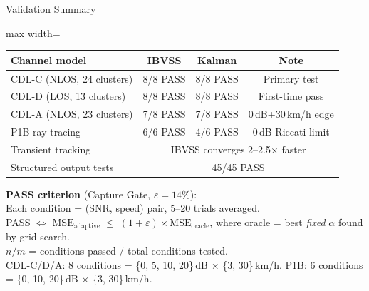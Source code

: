 \documentclass[aspectratio=169, 11pt]{beamer}
\begin{document}
\begin{frame}{Validation Summary}
\centering
\footnotesize
\begin{adjustbox}{max width=\linewidth}
\begin{tabular}{lccc}
\toprule
\textbf{Channel model} & \textbf{IBVSS} & \textbf{Kalman} & \textbf{Note} \\
\midrule
CDL-C (NLOS, 24 clusters) & 8/8 PASS & 8/8 PASS & Primary test \\
CDL-D (LOS, 13 clusters)  & 8/8 PASS & 8/8 PASS & First-time pass \\
CDL-A (NLOS, 23 clusters) & 7/8 PASS & 7/8 PASS & 0\,dB+30\,km/h edge \\
P1B ray-tracing            & 6/6 PASS & 4/6 PASS & 0\,dB Riccati limit \\
\midrule
Transient tracking         & \multicolumn{3}{c}{IBVSS converges 2--2.5$\times$ faster} \\
\midrule
Structured output tests    & \multicolumn{3}{c}{45/45 PASS} \\
\bottomrule
\end{tabular}
\end{adjustbox}

\vspace{5pt}
\raggedright
\scriptsize
\textbf{PASS criterion} (Capture Gate, $\varepsilon{=}14\%$): \\[2pt]
Each condition = (SNR, speed) pair, 5--20 trials averaged. \\
PASS $\Leftrightarrow$ $\text{MSE}_\text{adaptive} \;\le\; (1{+}\varepsilon) \times \text{MSE}_\text{oracle}$,
where oracle = best \textit{fixed} $\alpha$ found by grid search. \\[2pt]
$n/m$ = conditions passed / total conditions tested. \\
CDL-C/D/A: 8 conditions = \{0, 5, 10, 20\}\,dB $\times$ \{3, 30\}\,km/h. \quad
P1B: 6 conditions = \{0, 10, 20\}\,dB $\times$ \{3, 30\}\,km/h.
\end{frame}
\end{document}
